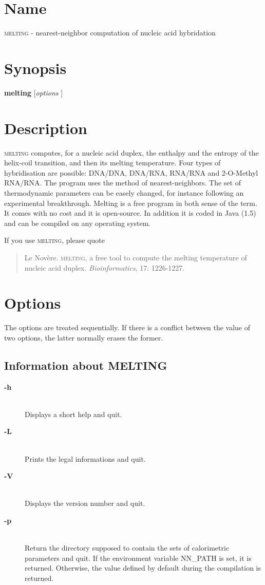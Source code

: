 \documentclass{article}
\begin{document}
 
\section{Name }
\textsc{melting} - nearest-neighbor computation of nucleic acid hybridation
\section{Synopsis}
\textbf{melting} [\textit{options }]  
\section{Description }

\textsc{melting} computes, for a nucleic acid duplex, the enthalpy and the
entropy of the helix-coil transition, and then its melting temperature. Four
types of hybridisation are possible: DNA/DNA, DNA/RNA, RNA/RNA and 2-O-Methyl RNA/RNA. The program
uses the method of nearest-neighbors. The set of thermodynamic parameters can be
easely changed, for instance following an experimental breakthrough. Melting is
a free program in both sense of the term. It comes with no cost and it is
open-source. In addition it is coded in Java (1.5) and can be compiled on any
operating system.

If you use \textsc{melting}, please quote

\begin{quote}
  Le Nov\`ere. \textsc{melting}, a free tool to compute the
    melting temperature of nucleic acid duplex. \emph{Bioinformatics}, 17: 1226-1227. 
\end{quote}

\section{Options }

The options are treated sequentially. If there is a conflict between the value
of two options, the latter normally erases the former.

\subsection{Information about MELTING}
\begin{description}

\item [\textbf{-h}]\mbox{}\\ 
  Displays a short help and quit.
\item [\textbf{-L}]\mbox{}\\ 
  Prints the legal informations and quit. 
\item [\textbf{-V}  ]\mbox{}\\ 
  Displays the version number and quit.  
\item [\textbf{-p}]\mbox{}\\ 
  Return the directory supposed to contain the sets of calorimetric parameters and quit. 
  If the environment variable NN\_PATH is set, it is returned. Otherwise, the value
  defined by default during the compilation is returned.
\end{description}
\end{document}
